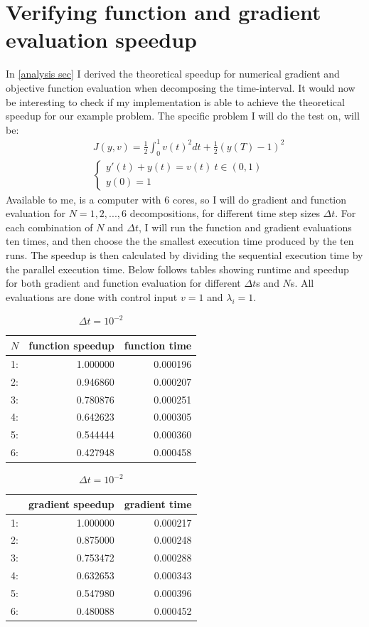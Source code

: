 \section{Verifying function and gradient evaluation speedup} \label{ver S sec}
In \ref{analysis sec} I derived the theoretical speedup for numerical gradient and objective function evaluation when decomposing the time-interval. It would now be interesting to check if my implementation is able to achieve the theoretical speedup for our example problem. The specific problem I will do the test on, will be:
\begin{align*}
&J(y,v) = \frac{1}{2}\int_0^1v(t)^2dt + \frac{1}{2}(y(T)-1)^2 \\
&\left\{
     \begin{array}{lr}
       	y'(t)+y(t) = v(t) \ t\in(0,1)\\
       	y(0)=1
     \end{array}
   \right. 
\end{align*}
Available to me, is a computer with 6 cores, so I will do gradient and function evaluation for $N=1,2,...,6$ decompositions, for different time step sizes $\Delta t$. For each combination of $N$ and $\Delta t$, I will run the function and gradient evaluations ten times, and then choose the the smallest execution time produced by the ten runs. The speedup is then calculated by dividing the sequential execution time by the parallel execution time. Below follows tables showing runtime and speedup for both gradient and function evaluation for different $\Delta t$s and $N$s. All evaluations are done with control input $v=1$ and $\lambda_i=1$.  
\\
\begin{table}[!h]
\centering
\caption{$\Delta t=10^{-2}$}
\begin{tabular}{lrr}
\toprule
{} $N$&   function speedup &      function time \\
\midrule
1: &  1.000000 &  0.000196 \\
2: &  0.946860 &  0.000207 \\
3: &  0.780876 &  0.000251 \\
4: &  0.642623 &  0.000305 \\
5: &  0.544444 &  0.000360 \\
6: &  0.427948 &  0.000458 \\
\bottomrule
\end{tabular}
\begin{tabular}{lrr}
\toprule
{} &  gradient speedup &     gradient time \\
\midrule
1: &  1.000000 &  0.000217 \\
2: &  0.875000 &  0.000248 \\
3: &  0.753472 &  0.000288 \\
4: &  0.632653 &  0.000343 \\
5: &  0.547980 &  0.000396 \\
6: &  0.480088 &  0.000452 \\
\bottomrule
\end{tabular}
\end{table}
